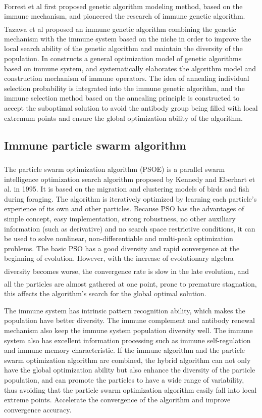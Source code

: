\documentclass[11pt,a4paper,oldfontcommands]{memoir}
\newcommand{\upcite}[1]{\textsuperscript{\textsuperscript{\cite{#1}}}}
\begin{document}
Forrest et al\upcite{Forrest.1994} first proposed genetic algorithm modeling method, based on the immune mechanism, and pioneered the research of immune genetic algorithm. Tazawa et al\upcite{Tazawa.1997} proposed an immune genetic algorithm combining the genetic mechanism with the immune system based on the niche in order to improve the local search ability of the genetic algorithm and maintain the diversity of the population. In \cite{Jiao.2000} constructs a general optimization model of genetic algorithms based on immune system, and systematically elaborates the algorithm model and construction mechanism of immune operators. The idea of annealing individual selection probability is integrated into the immune genetic algorithm, and the immune selection method based on the annealing principle is constructed to accept the suboptimal solution to avoid the antibody group being filled with local extremum points and ensure the global optimization ability of the algorithm.

\subsection{Immune particle swarm algorithm}
The particle swarm optimization algorithm (PSOE)\upcite{Kennedy.1995} is a parallel swarm intelligence optimization search algorithm proposed by Kennedy and Eberhart et al. in 1995. It is based on the migration and clustering models of birds and fish during foraging. The algorithm is iteratively optimized by learning each particle's experience of its own and other particles. Because PSO has the advantages of simple concept, easy implementation, strong robustness, no other auxiliary information (such as derivative) and no search space restrictive conditions, it can be used to solve nonlinear, non-differentiable and multi-peak optimization problems. The basic PSO has a good diversity and rapid convergence at the beginning of evolution. However, with the increase of evolutionary algebra diversity becomes worse, the convergence rate is slow in the late evolution\upcite{Parsopoulos.2009}, and all the particles are almost gathered at one point, prone to premature stagnation\upcite{Ratnaweera.2004}, this affects the algorithm's search for the global optimal solution.

The immune system has intrinsic pattern recognition ability, which makes the population have better diversity. The immune complement and antibody renewal mechanism also keep the immune system population diversity well. The immune system also has excellent information processing such as immune self-regulation and immune memory characteristic. If the immune algorithm and the particle swarm optimization algorithm are combined, the hybrid algorithm can not only have the global optimization ability but also enhance the diversity of the particle population, and can promote the particles to have a wide range of variability, thus avoiding that the particle swarm optimization algorithm easily fall into local extreme points. Accelerate the convergence of the algorithm and improve convergence accuracy. 
\end{document}
